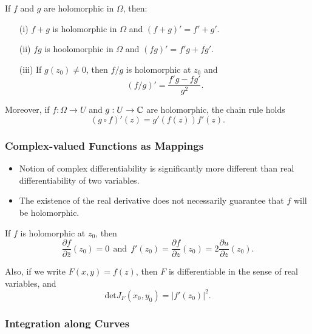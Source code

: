 \documentclass[11pt,a4paper]{book}
\begin{document}
\begin{prop}
    If \( f  \) and \( g  \) are holomorphic in \( \Omega  \), then:
    \begin{enumerate}
        \item[(i)] \( f + g  \) is holomorphic in \( \Omega  \) and \( (f+ g)' = f' + g' \).
        \item[(ii)] \( fg  \) is hoolomorphic in \( \Omega  \) and \( (fg)' = f'g + f g' \).
        \item[(iii)] If \( g({z}_{0}) \neq 0  \), then \( f / g  \) is holomorphic at \( {z}_{0} \) and
            \[  (f/g)' = \frac{ f' g - f g' }{ g^{2} }. \]
    \end{enumerate}
    Moreover, if \( f : \Omega \to U  \) and \( g: U \to \mathbb{C}  \) are holomorphic, the chain rule holds
    \[  (g \circ f)'(z) = g'(f(z)) f'(z).  \]
\end{prop}

\subsubsection{Complex-valued Functions as Mappings}

\begin{itemize}
    \item Notion of complex differentiability is significantly more different than real differentiability of two variables.
    \item The existence of the real derivative does not necessarily guarantee that \( f  \) will be holomorphic.
\end{itemize}

\begin{prop}
   If \( f  \) is holomorphic at \( {z}_{0} \), then 
   \[ \frac{ \partial f  }{  \partial \overline{z} } ({z}_{0}) = 0 \ \ \text{and} \ \ f'({z}_{0}) = \frac{ \partial f  }{ \partial z  } ({z}_{0}) = 2 \frac{ \partial u  }{  \partial z  } ({z}_{0}).  \] 

   Also, if we write \( F(x,y) = f(z) \), then \( F  \) is differentiable in the sense of real variables, and
   \[  \text{det} {J}_{F}({x}_{0}, {y}_{0}) = | f'({z}_{0}) |^{2}.  \]
\end{prop}


\subsubsection{Integration along Curves}
\end{document}
